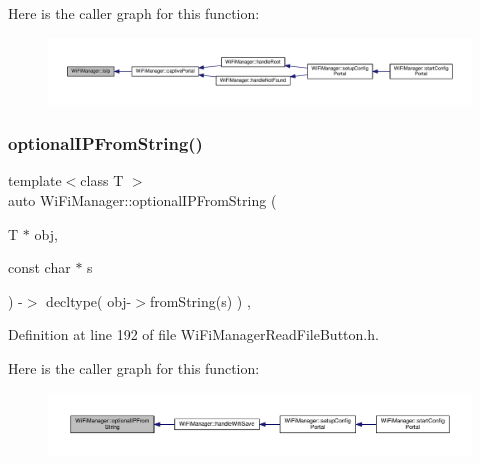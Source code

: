 Here is the caller graph for this function\+:\nopagebreak
\begin{figure}[H]
\begin{center}
\leavevmode
\includegraphics[width=350pt]{class_wi_fi_manager_a9c78a8774f746ec22a99d03a53baa607_icgraph}
\end{center}
\end{figure}
\mbox{\label{class_wi_fi_manager_a6a94f08eb43e0871932556a4ccfa11b7}} 
\subsubsection{\texorpdfstring{optional\+I\+P\+From\+String()}{optionalIPFromString()}\hspace{0.1cm}{\footnotesize\ttfamily [1/2]}}
{\footnotesize\ttfamily template$<$class T $>$ \\
auto Wi\+Fi\+Manager\+::optional\+I\+P\+From\+String (\begin{DoxyParamCaption}\item[{T $\ast$}]{obj,  }\item[{const char $\ast$}]{s }\end{DoxyParamCaption}) -\/$>$ decltype(  obj-\/$>$from\+String(s)  ) \hspace{0.3cm}{\ttfamily [inline]}, {\ttfamily [private]}}



Definition at line 192 of file Wi\+Fi\+Manager\+Read\+File\+Button.\+h.

Here is the caller graph for this function\+:\nopagebreak
\begin{figure}[H]
\begin{center}
\leavevmode
\includegraphics[width=350pt]{class_wi_fi_manager_a6a94f08eb43e0871932556a4ccfa11b7_icgraph}
\end{center}
\end{figure}
\mbox{\label{class_wi_fi_manager_aa248b818eee0423b14a88c637f7c4637}} 

